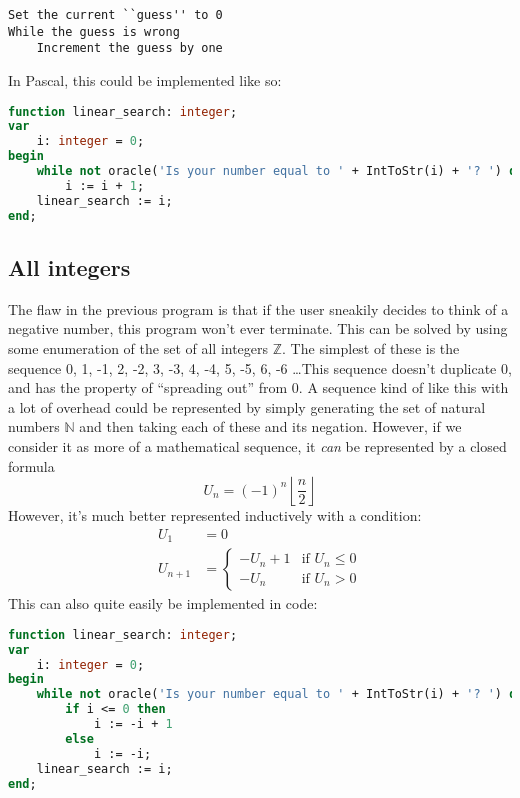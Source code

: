 \documentclass[fleqn,a4paper,11pt]{article}
\begin{document}
\begin{lstlisting}[caption=Linear search on $\mathbb{N}$ pseudocode]
Set the current ``guess'' to 0
While the guess is wrong
    Increment the guess by one
\end{lstlisting}

    In Pascal, this could be implemented like so:

\begin{lstlisting}[language=Pascal, caption=Linear search on $\mathbb{N}$ implementation]
function linear_search: integer;
var
    i: integer = 0;
begin
    while not oracle('Is your number equal to ' + IntToStr(i) + '? ') do
        i := i + 1;
    linear_search := i;
end;
\end{lstlisting}

    \subsection{All integers}

    The flaw in the previous program is that if the user sneakily decides to
    think of a negative number, this program won't ever terminate. This can be
    solved by using some enumeration of the set of all integers $\mathbb{Z}$.
    The simplest of these is the sequence 0, 1, -1, 2, -2, 3, -3, 4, -4, 5, -5,
    6, -6 \ldots This sequence doesn't duplicate 0, and has the property of
    ``spreading out'' from 0. A sequence kind of like this with a lot of
    overhead could be represented by simply generating the set of natural
    numbers $\mathbb{N}$ and then taking each of these and its negation.
    However, if we consider it as more of a mathematical sequence, it
    \emph{can} be represented by a closed formula
    \begin{equation}
        U_n = (-1)^n \left\lfloor \frac{n}{2} \right\rfloor
    \end{equation}
    However, it's much better represented inductively with a condition:
    \begin{align*}
        U_1 &= 0 \\
        U_{n + 1} &=
        \begin{cases}
            -U_n + 1 & \text{if } U_n \leq 0 \\
            -U_n     & \text{if } U_n > 0
        \end{cases}
    \end{align*}
    This can also quite easily be implemented in code:

\begin{lstlisting}[language=Pascal,
                   caption=Linear search on $\mathbb{Z}$ implementation]
function linear_search: integer;
var
    i: integer = 0;
begin
    while not oracle('Is your number equal to ' + IntToStr(i) + '? ') do
        if i <= 0 then
            i := -i + 1
        else
            i := -i;
    linear_search := i;
end;
\end{lstlisting}
\end{document}
